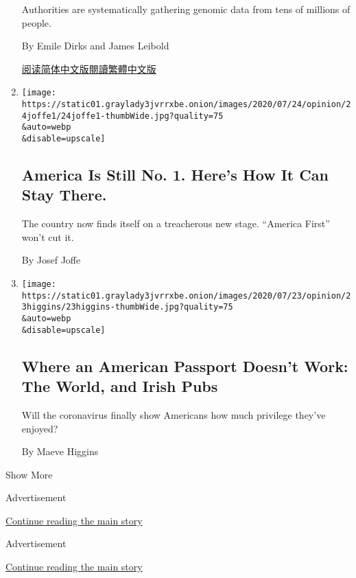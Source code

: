 \begin{enumerate}
  Authorities are systematically gathering genomic data from tens of
  millions of people.

  By Emile Dirks and James Leibold

  \href{https://cn.nytimes3xbfgragh.onion/opinion/20200728/china-dna-police/}{阅读简体中文版}\href{https://cn.nytimes3xbfgragh.onion/opinion/20200728/china-dna-police/zh-hant/}{閱讀繁體中文版}
\item
  \href{/2020/07/24/opinion/united-states-europe-china.html}{}

  \texttt{[image: https://static01.graylady3jvrrxbe.onion/images/2020/07/24/opinion/24joffe1/24joffe1-thumbWide.jpg?quality=75\\\&auto=webp\\\&disable=upscale]}

  \hypertarget{america-is-still-no-1-heres-how-it-can-stay-there}{%
  \subsection{America Is Still No. 1. Here's How It Can Stay
  There.}\label{america-is-still-no-1-heres-how-it-can-stay-there}}

  The country now finds itself on a treacherous new stage. ``America
  First'' won't cut it.

  By Josef Joffe
\item
  \href{/2020/07/23/opinion/passport-coronavirus-travel.html}{}

  \texttt{[image: https://static01.graylady3jvrrxbe.onion/images/2020/07/23/opinion/23higgins/23higgins-thumbWide.jpg?quality=75\\\&auto=webp\\\&disable=upscale]}

  \hypertarget{where-an-american-passport-doesnt-work-the-world-and-irish-pubs}{%
  \subsection{Where an American Passport Doesn't Work: The World, and
  Irish
  Pubs}\label{where-an-american-passport-doesnt-work-the-world-and-irish-pubs}}

  Will the coronavirus finally show Americans how much privilege they've
  enjoyed?

  By Maeve Higgins
\end{enumerate}

Show More

Advertisement

\protect\hyperlink{after-mid1}{Continue reading the main story}

Advertisement

\protect\hyperlink{after-mktg}{Continue reading the main story}


